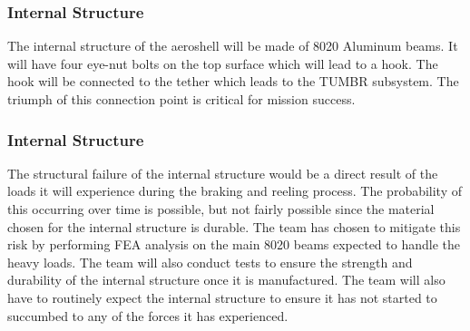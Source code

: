 \subsubsection{Internal Structure}
\indent\indent The internal structure of the aeroshell will be made of 8020 Aluminum beams. It will have four eye-nut bolts on the top surface which will lead to a hook. The hook will be connected to the tether which leads to the TUMBR subsystem. The triumph of this connection point is critical for mission success. 
\begin{table}[H]
\caption{\label{tab:internal_structure} Internal Structure Failure Modes \& Probabilities}
\centering

\end{table}
\subsubsection*{Internal Structure}
\indent\indent The structural failure of the internal structure would be a direct result of the loads it will experience during the braking and reeling process. The probability of this occurring over time is possible, but not fairly possible since the material chosen for the internal structure is durable. The team has chosen to mitigate this risk by performing FEA analysis on the main 8020 beams expected to handle the heavy loads. The team will also conduct tests to ensure the strength and durability of the internal structure once it is manufactured. The team will also have to routinely expect the internal structure to ensure it has not started to succumbed to any of the forces it has experienced. 

